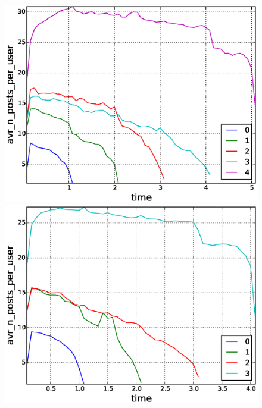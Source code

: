 \begin{figure}[!tb]
\centering
\includegraphics[scale=0.25]{./images/avr_posts_per_user_for_surviving_year_for_2010.eps}
\includegraphics[scale=0.25]{./images/avr_posts_per_user_for_surviving_year_for_2011.eps}

\end{figure}
